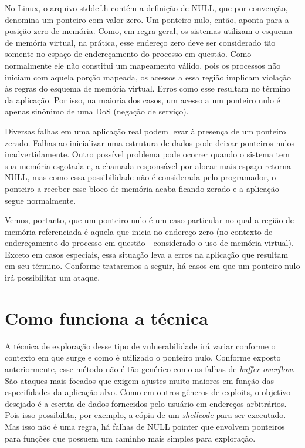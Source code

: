 		No Linux, o arquivo stddef.h contém a definição de NULL, que por
		convenção, denomina um ponteiro com valor zero.
		Um ponteiro nulo, então, aponta para a posição zero de memória. 
		Como, em regra geral, os sistemas utilizam o esquema de memória virtual,
		na prática, esse endereço zero deve ser considerado tão somente no espaço
		de endereçamento do processo em questão.
		Como normalmente ele não constitui um mapeamento válido, pois os processos não
		iniciam com aquela porção mapeada, os acessos a essa região implicam violação
		às regras do esquema de memória virtual. Erros como esse resultam
		no término da aplicação. Por isso, na maioria dos casos, um acesso a um ponteiro
		nulo é apenas sinônimo de uma DoS (negação de serviço).


				
		Diversas falhas em uma aplicação real podem levar à presença de um ponteiro zerado.
		Falhas ao inicializar uma estrutura de dados pode deixar ponteiros nulos inadvertidamente.
		Outro possível problema pode ocorrer quando o sistema tem sua memória esgotada e, 
		a chamada responsável por alocar mais espaço retorna NULL, mas como essa possibilidade não é considerada
		pelo programador, o ponteiro a receber esse bloco de memória acaba ficando zerado e a aplicação
		segue normalmente.
		
		Vemos, portanto, que um ponteiro nulo é um caso particular no qual a região de memória
		referenciada é aquela que inicia no endereço zero (no contexto de endereçamento do
		processo em questão - considerado o uso de memória virtual). 
		Exceto em casos especiais, essa situação leva a erros na aplicação que resultam em seu término.
		Conforme trataremos a seguir, há casos em que um ponteiro nulo irá possibilitar um ataque.		

	\section{Como funciona a técnica}
		A técnica de exploração desse tipo de vulnerabilidade irá variar conforme o contexto
		em que surge e como é utilizado o ponteiro nulo. 
		Conforme exposto anteriormente, esse método não é tão genérico como as falhas de \textsl{buffer overflow}.
		São ataques mais focados que exigem ajustes muito maiores em função das especifidades da aplicação alvo.
		Como em outros gêneros de exploits, o objetivo desejado é a escrita de dados fornecidos 
		pelo usuário em endereços arbitrários. Pois isso possibilita, por exemplo,
		a cópia de um \textsl{shellcode} para ser executado. Mas isso não é uma regra, há falhas
		de NULL pointer que envolvem ponteiros para funções que possuem um caminho mais simples
		para exploração.

